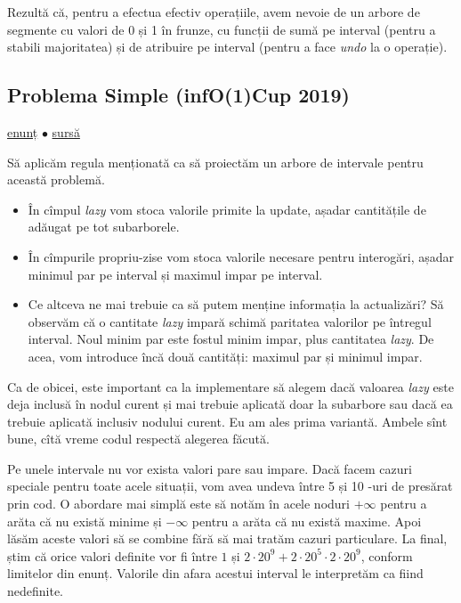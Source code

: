 Rezultă că, pentru a efectua efectiv operațiile, avem nevoie de un arbore de segmente cu valori de 0 și 1 în frunze, cu funcții de sumă pe interval (pentru a stabili majoritatea) și de atribuire pe interval (pentru a face \textit{undo} la o operație).

\subsection{Problema Simple (infO(1)Cup 2019)}
\label{problem:simple}

\href{https://kilonova.ro/problems/3424/}{enunț}
$\bullet$
\hyperref[code:simple]{sursă}

Să aplicăm regula menționată ca să proiectăm un arbore de intervale pentru această problemă.

\begin{itemize}
  \item În cîmpul \textit{lazy} vom stoca valorile primite la update, așadar cantitățile de adăugat pe tot subarborele.
  \item În cîmpurile propriu-zise vom stoca valorile necesare pentru interogări, așadar minimul par pe interval și maximul impar pe interval.
  \item Ce altceva ne mai trebuie ca să putem menține informația la actualizări? Să observăm că o cantitate \textit{lazy} impară schimă paritatea valorilor pe întregul interval. Noul minim par este fostul minim impar, plus  cantitatea \textit{lazy}. De acea, vom introduce încă două cantități: maximul par și minimul impar.
\end{itemize}

Ca de obicei, este important ca la implementare să alegem dacă valoarea \textit{lazy} este deja inclusă în nodul curent și mai trebuie aplicată doar la subarbore sau dacă ea trebuie aplicată inclusiv nodului curent. Eu am ales prima variantă. Ambele sînt bune, cîtă vreme codul respectă alegerea făcută.

Pe unele intervale nu vor exista valori pare sau impare. Dacă facem cazuri speciale pentru toate acele situații, vom avea undeva între 5 și 10 -uri de presărat prin cod. O abordare mai simplă este să notăm în acele noduri $+\infty$ pentru a arăta că nu există minime și $-\infty$ pentru a arăta că nu există maxime. Apoi lăsăm aceste valori să se combine fără să mai tratăm cazuri particulare. La final, știm că orice valori definite vor fi între $1$ și $2 \cdot 20^9 + 2 \cdot 20^5 \cdot 2 \cdot 20^9$, conform limitelor din enunț. Valorile din afara acestui interval le interpretăm ca fiind nedefinite.

